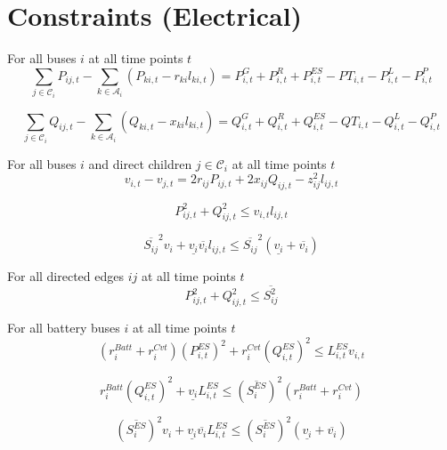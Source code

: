 \documentclass{article}
\newcommand{\lo}[1]{\underline{#1}}
\newcommand{\hi}[1]{\overline{#1}}
\def\sC{\mathcal C}
\def\sA{\mathcal A}
\begin{document}
\section{Constraints (Electrical)}
For all buses $i$ at all time points $t$
\begin{equation}
  \sum_{j \in \sC_i} P_{ij,t} - \sum_{k \in \sA_i} (P_{ki,t} - r_{ki} l_{ki,t}) =
  P^G_{i,t} + P^R_{i,t} + P^{ES}_{i,t} - PT_{i,t} - P^L_{i,t} - P^P_{i,t}
\end{equation}

\begin{equation}
  \sum_{j \in \sC_i} Q_{ij,t} - \sum_{k \in \sA_i} (Q_{ki,t} - x_{ki} l_{ki,t}) =
  Q^G_{i,t} + Q^R_{i,t} + Q^{ES}_{i,t} - QT_{i,t} - Q^L_{i,t} - Q^P_{i,t}
\end{equation}


For all buses $i$ and direct children $j \in \sC_i$ at all time points $t$
\begin{equation}
  v_{i,t} - v_{j,t} = 2r_{ij}P_{ij,t} + 2x_{ij}Q_{ij,t} - z^2_{ij}l_{ij,t}
\end{equation}

\begin{equation}
  P^2_{ij,t} + Q^2_{ij,t} \leq v_{i,t} l_{ij,t}
\end{equation}

\begin{equation}
  \hi{S_{ij}}^2v_i + \lo{v_i}\hi{v_i}l_{ij,t} \leq
  \hi{S_{ij}}^2 (\lo{v_i} + \hi{v_i})
\end{equation}

For all directed edges $ij$ at all time points $t$
\begin{equation}
  P^2_{ij,t} + Q^2_{ij,t} \leq \hi{S^2_{ij}}
\end{equation}

For all battery buses $i$ at all time points $t$
\begin{equation}
  (r^{Batt}_i + r^{Cvt}_i)(P^{ES}_{i,t})^2 + r^{Cvt}_i (Q^{ES}_{i,t})^2 \leq
  L^{ES}_{i,t}v_{i,t}
\end{equation}

\begin{equation}
  r^{Batt}_i (Q^{ES}_{i,t})^2 + \lo{v_i} L^{ES}_{i,t} \leq
  (\hi{S^{ES}_i})^2(r^{Batt}_i + r^{Cvt}_i)
\end{equation}

\begin{equation}
  (\hi{S^{ES}_i})^2v_i + \lo{v_i}\hi{v_i}L^{ES}_{i,t} \leq
  (\hi{S^{ES}_i})^2(\lo{v_i} + \hi{v_i})
\end{equation}
\end{document}
